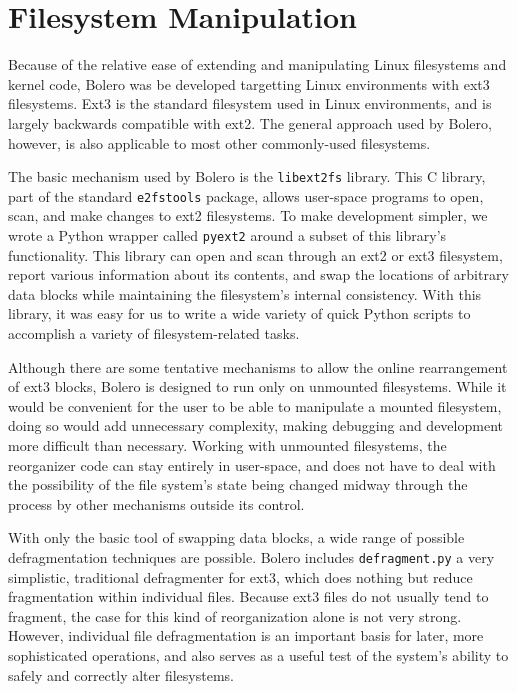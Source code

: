 \documentclass[10pt,twocolumn,letterpaper]{article}
\begin{document}
\section{Filesystem Manipulation}

Because of the relative ease of extending and manipulating Linux filesystems and
kernel code, Bolero was be developed targetting Linux environments with ext3
filesystems. Ext3 is the standard filesystem used in Linux
environments, and is largely backwards compatible with ext2\cite{ext2journal}.
The general approach used by Bolero, however, is also applicable to most other commonly-used
filesystems.

The basic mechanism used by Bolero is the \texttt{libext2fs} library. This C
library, part of the standard \texttt{e2fstools} package, allows user-space programs
to open, scan, and make changes to ext2 filesystems. To make development simpler, we wrote
a Python wrapper called \texttt{pyext2} around a subset of this library's functionality.
This library can open and scan through an ext2 or ext3 filesystem, report
various information about its contents, and swap the locations of arbitrary data
blocks while maintaining the filesystem's internal consistency. With this library,
it was easy for us to write a wide variety of quick Python scripts to accomplish
a variety of filesystem-related tasks.

Although there are some tentative mechanisms to allow the online rearrangement
of ext3 blocks\cite{ext3online}, Bolero is designed to run only on unmounted filesystems.
While it would be
convenient for the user to be able to manipulate a mounted filesystem, doing so
would add unnecessary complexity, making debugging and
development more difficult than necessary. Working with unmounted filesystems,
the reorganizer code can stay entirely in user-space, and does not have
to deal with the possibility of the file system's state being changed
midway through the process by other mechanisms outside its control.

With only the basic tool of swapping data blocks, a wide range of possible
defragmentation techniques are possible. Bolero includes \texttt{defragment.py}
a very simplistic, traditional defragmenter for ext3, which
does nothing but reduce fragmentation within individual files. Because ext3 files do
not usually tend to fragment, the case for this kind of reorganization alone
is not very strong. However, individual file defragmentation is an important
basis for later, more sophisticated operations, and also serves as a useful test
of the system's ability to safely and correctly alter filesystems.
\end{document}
